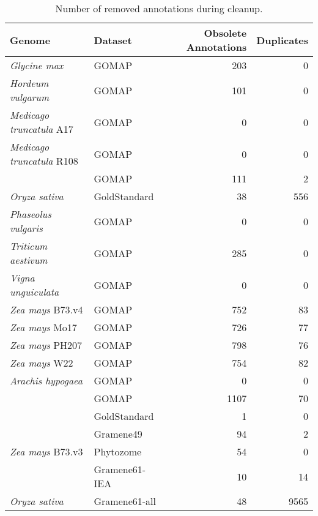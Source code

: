 \documentclass[utf8]{frontiersSCNS}
\begin{document}
\begin{table}[t]

\caption{\label{tab:cleanup-table}Number of removed annotations during cleanup.}
\centering
\begin{tabular}{llrr}
\toprule
Genome & Dataset & Obsolete Annotations & Duplicates\\
\midrule
\rowcolor{gray!6}  \textit{Glycine max} & GOMAP & 203 & 0\\
\cmidrule{1-4}
\textit{Hordeum vulgarum} & GOMAP & 101 & 0\\
\cmidrule{1-4}
\rowcolor{gray!6}  \textit{Medicago truncatula} A17 & GOMAP & 0 & 0\\
\cmidrule{1-4}
\textit{Medicago truncatula} R108 & GOMAP & 0 & 0\\
\cmidrule{1-4}
\rowcolor{gray!6}   & GOMAP & 111 & 2\\

\multirow{-2}{*}{\raggedright\arraybackslash \textit{Oryza sativa}} & GoldStandard & 38 & 556\\
\cmidrule{1-4}
\rowcolor{gray!6}  \textit{Phaseolus vulgaris} & GOMAP & 0 & 0\\
\cmidrule{1-4}
\textit{Triticum aestivum} & GOMAP & 285 & 0\\
\cmidrule{1-4}
\rowcolor{gray!6}  \textit{Vigna unguiculata} & GOMAP & 0 & 0\\
\cmidrule{1-4}
\textit{Zea mays} B73.v4 & GOMAP & 752 & 83\\
\cmidrule{1-4}
\rowcolor{gray!6}  \textit{Zea mays} Mo17 & GOMAP & 726 & 77\\
\cmidrule{1-4}
\textit{Zea mays} PH207 & GOMAP & 798 & 76\\
\cmidrule{1-4}
\rowcolor{gray!6}  \textit{Zea mays} W22 & GOMAP & 754 & 82\\
\cmidrule{1-4}
\textit{Arachis hypogaea} & GOMAP & 0 & 0\\
\cmidrule{1-4}
\rowcolor{gray!6}   & GOMAP & 1107 & 70\\

 & GoldStandard & 1 & 0\\

\rowcolor{gray!6}   & Gramene49 & 94 & 2\\

\multirow{-4}{*}{\raggedright\arraybackslash \textit{Zea mays} B73.v3} & Phytozome & 54 & 0\\
\cmidrule{1-4}
\rowcolor{gray!6}   & Gramene61-IEA & 10 & 14\\

\multirow{-2}{*}{\raggedright\arraybackslash \textit{Oryza sativa}} & Gramene61-all & 48 & 9565\\
\bottomrule
\end{tabular}
\end{table}
\end{document}
